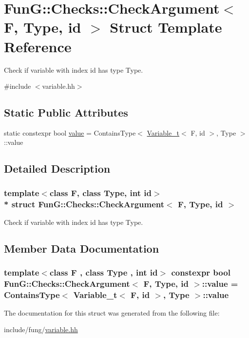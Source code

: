 \hypertarget{structFunG_1_1Checks_1_1CheckArgument}{}\section{FunG\+:\+:Checks\+:\+:Check\+Argument$<$ F, Type, id $>$ Struct Template Reference}
\label{structFunG_1_1Checks_1_1CheckArgument}


Check if variable with index id has type Type.  




{\ttfamily \#include $<$variable.\+hh$>$}

\subsection*{Static Public Attributes}
\begin{DoxyCompactItemize}
\item 
static constexpr bool \hyperlink{structFunG_1_1Checks_1_1CheckArgument_a3fcfb96f05e293a8c317d34da929a5d4}{value} = Contains\+Type$<$ \hyperlink{namespaceFunG_a87d1f46d16454ba71f1706bc13ef4ab0}{Variable\+\_\+t}$<$ F, id $>$, Type $>$\+::value
\end{DoxyCompactItemize}


\subsection{Detailed Description}
\subsubsection*{template$<$class F, class Type, int id$>$\\*
struct Fun\+G\+::\+Checks\+::\+Check\+Argument$<$ F, Type, id $>$}

Check if variable with index id has type Type. 

\subsection{Member Data Documentation}
\subsubsection[{\texorpdfstring{value}{value}}]{\setlength{\rightskip}{0pt plus 5cm}template$<$class F , class Type , int id$>$ constexpr bool {\bf Fun\+G\+::\+Checks\+::\+Check\+Argument}$<$ F, Type, id $>$\+::value = Contains\+Type$<$ {\bf Variable\+\_\+t}$<$ F, id $>$, Type $>$\+::value\hspace{0.3cm}{\ttfamily [static]}}\hypertarget{structFunG_1_1Checks_1_1CheckArgument_a3fcfb96f05e293a8c317d34da929a5d4}{}\label{structFunG_1_1Checks_1_1CheckArgument_a3fcfb96f05e293a8c317d34da929a5d4}


The documentation for this struct was generated from the following file\+:\begin{DoxyCompactItemize}
\item 
include/fung/\hyperlink{variable_8hh}{variable.\+hh}\end{DoxyCompactItemize}
